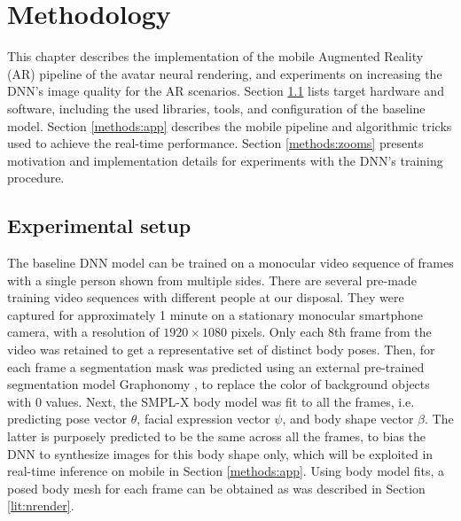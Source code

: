 \chapter{Methodology}\label{chapter:methods}

This chapter describes the implementation of the mobile Augmented Reality (AR) pipeline of the avatar neural rendering, and experiments on increasing the DNN's \cite{dnn:stylepeople21} image quality for the AR scenarios. Section \ref{methods:dev-setup} lists target hardware and software, including the used libraries, tools, and configuration of the baseline model. Section \ref{methods:app} describes the mobile pipeline and algorithmic tricks used to achieve the real-time performance. Section \ref{methods:zooms} presents motivation and implementation details for experiments with the DNN's training procedure.

\section{Experimental setup}\label{methods:dev-setup}

The baseline DNN \cite{dnn:stylepeople21} model can be trained on a monocular video sequence of frames with a single person shown from multiple sides. There are several pre-made training video sequences with different people at our disposal. They were captured for approximately 1 minute on a stationary monocular smartphone camera, with a resolution of $1920 \times 1080$ pixels. Only each 8th frame from the video was retained to get a representative set of distinct body poses. Then, for each frame a segmentation mask was predicted using an external pre-trained segmentation model Graphonomy \cite{dnn:graphonomy19}, to replace the color of background objects with 0 values. Next, the SMPL-X \cite{dnn:smplx19} body model was fit to all the frames, i.e. predicting pose vector $\theta$, facial expression vector $\psi$, and body shape vector $\beta$. The latter is purposely predicted to be the same across all the frames, to bias the DNN to synthesize images for this body shape only, which will be exploited in real-time inference on mobile in Section \ref{methods:app}. Using body model fits, a posed body mesh for each frame can be obtained as was described in Section \ref{lit:nrender}. 

